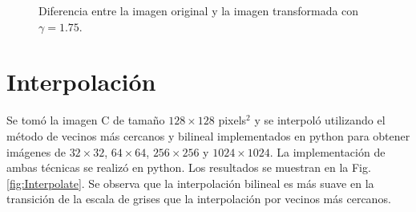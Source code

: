 \documentclass[letterpaper,12pt]{article}
\theoremstyle{plain}
\begin{document}
\begin{figure}[h]
\begin{subfigure}[h]{0.24\linewidth}
        \end{subfigure}
                \caption{Diferencia entre la imagen original y la imagen transformada con $\gamma = 1.75$.}
                \label{fig:Exptrans1.75_sustraction}
\end{figure}

\section{Interpolación \label{sec:ej3}}

\vspace{0.3cm}

Se tomó la imagen C de tamaño $128\times128$ pixels$^2$ y se interpoló utilizando el método de vecinos más cercanos y bilineal implementados en python para obtener imágenes de $32\times32$, $64\times64$, $256\times256$ y $1024\times1024$. La implementación de ambas técnicas se realizó en python. Los resultados se muestran en la Fig. \ref{fig:Interpolate}. Se observa que la interpolación bilineal es más suave en la transición de la escala de grises que la interpolación por vecinos más cercanos.
\end{document}
